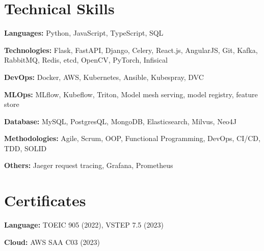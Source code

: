 \documentclass[letterpaper,11pt]{article}
\begin{document}
\section{Technical Skills}
 \begin{itemize}[leftmargin=0.15in, label={}]
    \small{\item{
     \textbf{Languages:}{ Python, JavaScript, TypeScript, SQL} \\ \vspace{3pt}

        \textbf{Technologies:}{ Flask, FastAPI, Django, Celery, React.js, AngularJS, Git, Kafka, RabbitMQ, Redis, etcd, OpenCV, PyTorch, Infisical} \\ \vspace{3pt}

        \textbf{DevOps:}{ Docker, AWS, Kubernetes, Ansible, Kubespray, DVC} \\ \vspace{3pt}

        \textbf{MLOps:}{ MLflow, Kubeflow, Triton, Model mesh serving, model registry, feature store} \\  \vspace{3pt}

        \textbf{Database:}{  MySQL, PostgresQL, MongoDB, Elasticsearch, Milvus, Neo4J} \\ \vspace{3pt}

        \textbf{Methodologies:}{ Agile, Scrum, OOP, Functional Programming, DevOps, CI/CD, TDD, SOLID} \\ \vspace{3pt}

	\textbf{Others: }{Jaeger request tracing, Grafana, Prometheus} \\ \vspace{3pt}
    }}
 \end{itemize}

\section{Certificates}
 \begin{itemize}[leftmargin=0.15in, label={}]
    \small{\item{
     \textbf{Language:}{ TOEIC 905 (2022), VSTEP 7.5 (2023)} \\ \vspace{3pt}

        \textbf{Cloud:}{ AWS SAA C03 (2023)} \\ \vspace{3pt}

    }}
 \end{itemize}



\end{document}
